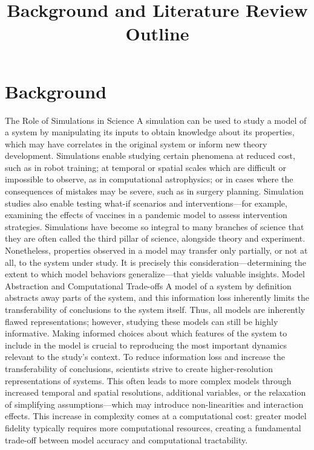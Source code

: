 \documentclass[12pt]{article}
\title{Background and Literature Review Outline}
\author{}
\date{}
\begin{document}
\maketitle


\section{Background}



The Role of Simulations in Science
A simulation can be used to study a model of a system by manipulating its inputs to obtain knowledge about its properties, which may have correlates in the original system or inform new theory development. Simulations enable studying certain phenomena at reduced cost, such as in robot training; at temporal or spatial scales which are difficult or impossible to observe, as in computational astrophysics; or in cases where the consequences of mistakes may be severe, such as in surgery planning. Simulation studies also enable testing what-if scenarios and interventions—for example, examining the effects of vaccines in a pandemic model to assess intervention strategies.
Simulations have become so integral to many branches of science that they are often called the third pillar of science, alongside theory and experiment. Nonetheless, properties observed in a model may transfer only partially, or not at all, to the system under study. It is precisely this consideration—determining the extent to which model behaviors generalize—that yields valuable insights.
Model Abstraction and Computational Trade-offs
A model of a system by definition abstracts away parts of the system, and this information loss inherently limits the transferability of conclusions to the system itself. Thus, all models are inherently flawed representations; however, studying these models can still be highly informative. Making informed choices about which features of the system to include in the model is crucial to reproducing the most important dynamics relevant to the study's context.
To reduce information loss and increase the transferability of conclusions, scientists strive to create higher-resolution representations of systems. This often leads to more complex models through increased temporal and spatial resolutions, additional variables, or the relaxation of simplifying assumptions—which may introduce non-linearities and interaction effects. This increase in complexity comes at a computational cost: greater model fidelity typically requires more computational resources, creating a fundamental trade-off between model accuracy and computational tractability.
\end{document}
